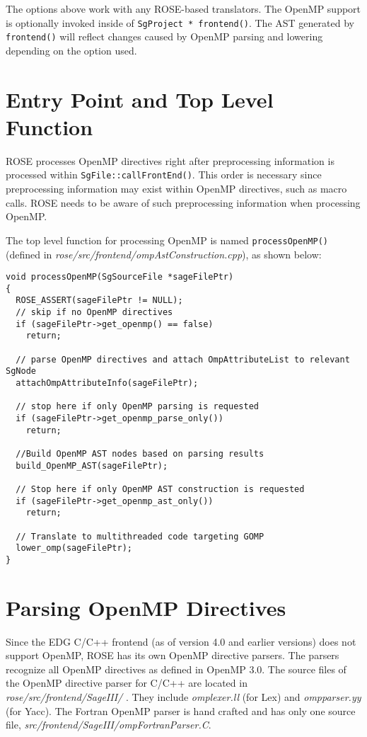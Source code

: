 The options above work with any ROSE-based translators. The OpenMP support
is optionally invoked inside of \lstinline{SgProject * frontend()}. The AST
generated by \lstinline{frontend()} will reflect changes caused by OpenMP parsing and lowering depending
on the option used.
\section{Entry Point and Top Level Function}
ROSE processes OpenMP directives right after preprocessing information is processed within \lstinline{SgFile::callFrontEnd()}.
This order is necessary since preprocessing information may exist within
OpenMP directives, such as macro calls.
ROSE needs to be aware of such preprocessing information when processing OpenMP.

The top level function for processing OpenMP is named
\lstinline{processOpenMP()} (defined in
\textit{rose/src/frontend/ompAstConstruction.cpp}), as shown below:
\lstset{language=C,basicstyle=\scriptsize,numbers=left}
\begin{lstlisting}
void processOpenMP(SgSourceFile *sageFilePtr)
{
  ROSE_ASSERT(sageFilePtr != NULL);
  // skip if no OpenMP directives
  if (sageFilePtr->get_openmp() == false)
    return;

  // parse OpenMP directives and attach OmpAttributeList to relevant SgNode
  attachOmpAttributeInfo(sageFilePtr);

  // stop here if only OpenMP parsing is requested
  if (sageFilePtr->get_openmp_parse_only())
    return;

  //Build OpenMP AST nodes based on parsing results
  build_OpenMP_AST(sageFilePtr);

  // Stop here if only OpenMP AST construction is requested
  if (sageFilePtr->get_openmp_ast_only())
    return;

  // Translate to multithreaded code targeting GOMP
  lower_omp(sageFilePtr);
}
\end{lstlisting}
\lstset{language=C,basicstyle=\small}

\section{Parsing OpenMP Directives}
Since the EDG C/C++ frontend (as of version 4.0 and earlier versions) does not support OpenMP, 
ROSE has its own OpenMP directive parsers. 
The parsers recognize all OpenMP directives as defined in OpenMP 3.0.
The source files of the OpenMP directive parser for C/C++ are located in \textit{rose/src/frontend/SageIII/ }.
They include \textit{omplexer.ll} (for Lex) and \textit{ompparser.yy} (for Yacc).
The Fortran OpenMP parser is hand crafted and has only one source file, \textit{src/frontend/SageIII/ompFortranParser.C}. 

